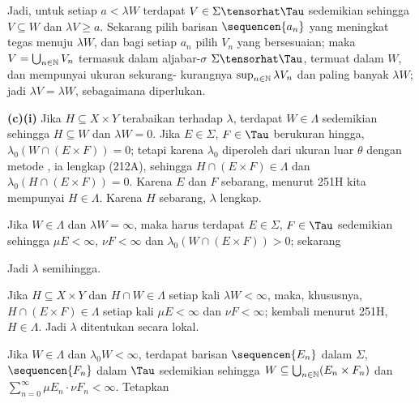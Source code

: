 {\medskip

 Jadi, untuk setiap $a<\lambda W$ terdapat
$V\in\Sigma\tensorhat\Tau$ sedemikian sehingga $V\subseteq W$ dan
$\lambda V\ge a$. Sekarang pilih barisan $\sequencen{a_n}$ yang meningkat
tegas menuju $\lambda W$, dan bagi setiap $a_n$ pilih $V_n$ yang
bersesuaian; maka $V=\bigcup_{n\in\Bbb N}V_n$ termasuk dalam aljabar-$\sigma$
$\Sigma\tensorhat\Tau$, termuat dalam $W$, dan mempunyai ukuran sekurang-
kurangnya $\sup_{n\in\Bbb N}\lambda V_n$ dan paling banyak $\lambda W$;
jadi $\lambda V=\lambda W$, sebagaimana diperlukan.

\medskip

{\bf (c)(i)} Jika $H\subseteq X\times Y$ terabaikan terhadap $\lambda$,
terdapat $W\in\Lambda$ sedemikian sehingga $H\subseteq W$ dan
$\lambda W=0$. Jika $E\in\Sigma$, $F\in\Tau$ berukuran hingga,
$\lambda_0(W\cap(E\times F))=0$; tetapi karena $\lambda_0$ diperoleh dari
ukuran luar $\theta$
dengan metode \Caratheodory, ia lengkap (212A), sehingga
$H\cap(E\times F)\in\Lambda$ dan $\lambda_0(H\cap(E\times F))=0$.
Karena $E$ dan $F$
sebarang, menurut 251H kita mempunyai $H\in\Lambda$. Karena $H$ sebarang,
$\lambda$ lengkap.

\medskip

 Jika $W\in\Lambda$ dan $\lambda W=\infty$, maka harus
terdapat $E\in\Sigma$, $F\in\Tau$ sedemikian sehingga $\mu E<\infty$,
$\nu F<\infty$ dan $\lambda_0(W\cap(E\times F))>0$; sekarang


\noindent Jadi $\lambda$ semihingga.

\medskip

 Jika $H\subseteq X\times Y$ dan $H\cap W\in\Lambda$
setiap kali $\lambda W<\infty$, maka, khususnya, $H\cap(E\times
F)\in\Lambda$ setiap kali $\mu E<\infty$ dan $\nu F<\infty$; kembali
menurut 251H, $H\in\Lambda$. Jadi $\lambda$ ditentukan secara lokal.

\medskip

 Jika $W\in\Lambda$ dan $\lambda_0W<\infty$, terdapat
barisan $\sequencen{E_n}$ dalam $\Sigma$, $\sequencen{F_n}$ dalam $\Tau$
sedemikian
sehingga $W\subseteq\bigcup_{n\in\Bbb N}(E_n\times F_n)$ dan
$\sum_{n=0}^{\infty}\mu E_n\cdot\nu F_n<\infty$. Tetapkan


}
